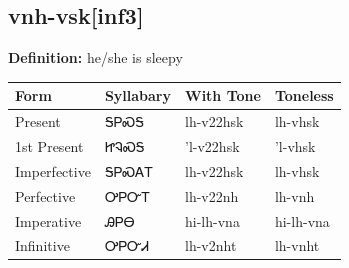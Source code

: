 \documentclass{article}%
\begin{document}
\subsection*{vnh-vsk[inf3]}%
\textbf{Definition: }%
he/she is sleepy%
\\[0.5em]%
\begin{tabular}{|l|l|l|l|}%
\hline%
\textbf{Form}&\textbf{Syllabary}&\textbf{With Tone}&\textbf{Toneless}\\%
\hline%
Present&ᎦᏢᏍᎦ&lh{-}v22hsk&lh{-}vhsk\\%
1st Present&ᏥᎸᏍᎦ&'l{-}v22hsk&'l{-}vhsk\\%
Imperfective&ᎦᏢᏍᎪᎢ&lh{-}v22hsk&lh{-}vhsk\\%
Perfective&ᎤᏢᏅᎢ&lh{-}v22nh&lh{-}vnh\\%
Imperative&ᎯᏢᎾ&hi{-}lh{-}vna&hi{-}lh{-}vna\\%
Infinitive&ᎤᏢᏅᏗ&lh{-}v2nht&lh{-}vnht\\%
\hline%
\end{tabular}%
\\[1em]%
\end{document}
